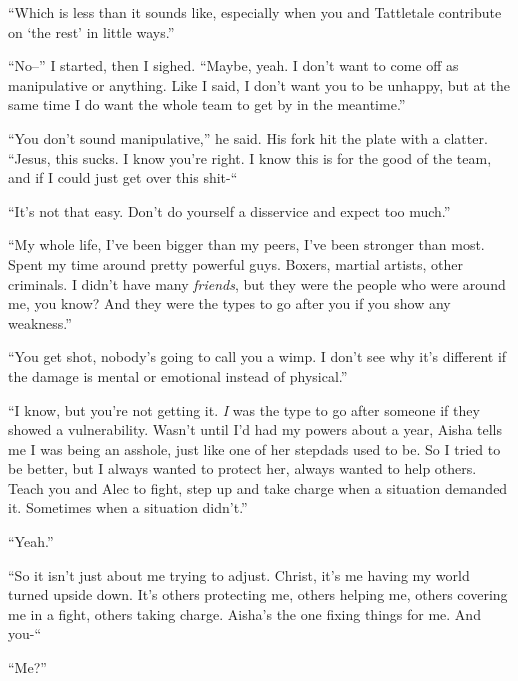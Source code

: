 ``Which is less than it sounds like, especially when you and Tattletale contribute on `the rest' in little ways.''



``No--'' I started, then I sighed.  ``Maybe, yeah.  I don't want to come off as manipulative or anything.  Like I said, I don't want you to be unhappy, but at the same time I do want the whole team to get by in the meantime.''



``You don't sound manipulative,'' he said.  His fork hit the plate with a clatter.  ``Jesus, this sucks.  I know you're right.  I know this is for the good of the team, and if I could just get over this shit-``



``It's not that easy.  Don't do yourself a disservice and expect too much.''



``My whole life, I've been bigger than my peers, I've been stronger than most.  Spent my time around pretty powerful guys.  Boxers, martial artists, other criminals.  I didn't have many \emph{friends}, but they were the people who were around me, you know?  And they were the types to go after you if you show any weakness.''



``You get shot, nobody's going to call you a wimp.  I don't see why it's different if the damage is mental or emotional instead of physical.''



``I know, but you're not getting it.  \emph{I} was the type to go after someone if they showed a vulnerability.  Wasn't until I'd had my powers about a year, Aisha tells me I was being an asshole, just like one of her stepdads used to be.  So I tried to be better, but I always wanted to protect her, always wanted to help others.  Teach you and Alec to fight, step up and take charge when a situation demanded it.  Sometimes when a situation didn't.''



``Yeah.''



``So it isn't just about me trying to adjust.  Christ, it's me having my world turned upside down.  It's others protecting me, others helping me, others covering me in a fight, others taking charge.  Aisha's the one fixing things for me.  And you-``



``Me?''



